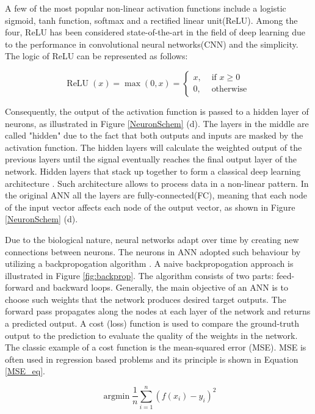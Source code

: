 A few of the most popular non-linear activation functions include a logistic sigmoid, tanh function, softmax and a rectified linear unit(ReLU). Among the four, ReLU has been considered state-of-the-art in the field of deep learning due to the performance in convolutional neural networks(CNN) \cite{Dubey2021} and the simplicity. The logic of ReLU can be represented as follows: 
  
\begin{equation}
	\operatorname{ReLU}(x)=\max (0, x)= \begin{cases}x, & \text { if } x \geq 0 \\ 0, & \text { otherwise }\end{cases}
\end{equation}

Consequently, the output of the activation function is passed to a hidden layer of neurons, as illustrated in Figure \ref{NeuronSchem} (d). The layers in the middle are called "hidden" due to the fact that both outputs and inputs are masked by the activation function.  The hidden layers will calculate the weighted output of the previous layers until the signal eventually reaches the final output layer of the network. Hidden layers that stack up together to form a classical deep learning architecture \cite{OShea2015}. Such architecture allows to process data in a non-linear pattern. In the original ANN all the layers are fully-connected(FC), meaning that each node of the input vector affects each node of the output vector, as shown in Figure \ref{NeuronSchem} (d).


Due to the biological nature, neural networks adapt over time by creating new connections between neurons. The neurons in ANN adopted such behaviour by utilizing a backpropogation algorithm \cite{Rumelhart:1986we}. A naive backpropogation approach is illustrated in Figure \ref{fig:backprop}. The algorithm consists of two parts: feed-forward and backward loops. Generally, the main objective of an ANN is to choose such weights that the network produces desired target outputs. The forward pass propagates along the nodes at each layer of the network and returns a predicted output. A cost (loss) function is used to compare the ground-truth output to the prediction to evaluate the quality of the weights in the network. The classic example of a cost function is the mean-squared error (MSE). MSE is often used in regression based problems and its principle is shown in Equation \ref{MSE_eq}.

\begin{equation}\label{MSE_eq} 
{\operatorname{argmin}} \frac{1}{n} \sum_{i=1}^{n}\left(f\left(x_{i}\right)-y_{i}\right)^{2}
\end{equation}

